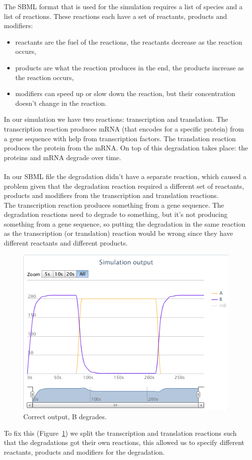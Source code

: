 \noindent The SBML format that is used for the simulation requires a list of species and a list of reactions. These reactions each have a set of reactants, products and modifiers:
\begin{itemize}
	\item reactants are the fuel of the reactions, the reactants decrease as the reaction occurs,
	\item products are what the reaction produces in the end, the products increase as the reaction occurs,
	\item modifiers can speed up or slow down the reaction, but their concentration doesn't change in the reaction.
\end{itemize}
In our simulation we have two reactions: transcription and translation. The transcription reaction produces mRNA (that encodes for a specific protein) from a gene sequence with help from transcription factors. The translation reaction produces the protein from the mRNA. On top of this degradation takes place: the proteins and mRNA degrade over time.\\
\\
In our SBML file the degradation didn't have a separate reaction, which caused a problem given that the degradation reaction required a different set of reactants, products and modifiers from the transcription and translation reactions.\\
The transcription reaction produces something from a gene sequence. The degradation reactions need to degrade to something, but it's not producing something from a gene sequence, so putting the degradation in the same reaction as the transcription (or translation) reaction would be wrong since they have different reactants and different products.\\

\begin{figure}
	\centering\includegraphics[scale=0.5]{../../screenshots/2012-06-14-not-output.png}
	\caption{Correct output, B degrades.}
	\label{fig:correct}
\end{figure}

To fix this (Figure~\ref{fig:correct}) we split the transcription and translation reactions such that the degradations got their own reactions, this allowed us to specify different reactants, products and modifiers for the degradation.
